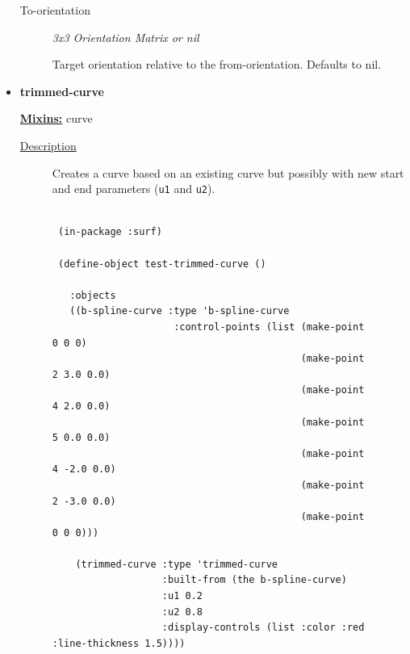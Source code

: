 \documentclass [11pt]{book}
\begin{document}
\begin{itemize}
\begin{description}
\item [To-orientation]
\emph{3x3 Orientation Matrix or nil}

 Target orientation relative to the from-orientation. Defaults to nil.




\end{description}







\item {}
\label{prim:trimmed-curve}
\textbf{trimmed-curve}


\textbf{
\underline{Mixins:}} curve





\begin{description}

\item [
\underline{Description}]


Creates a curve based on an existing curve but possibly with new start and end parameters (\texttt{u1} and \texttt{u2}).



\end{description}




\begin{figure}
\begin{lrbox}{\boxedverb}
\begin{minipage}{\linewidth}
{\small

\begin{verbatim}
  
 (in-package :surf)

 (define-object test-trimmed-curve ()

   :objects
   ((b-spline-curve :type 'b-spline-curve
                     :control-points (list (make-point 0 0 0)
                                           (make-point 2 3.0 0.0) 
                                           (make-point 4 2.0 0.0) 
                                           (make-point 5 0.0 0.0) 
                                           (make-point 4 -2.0 0.0) 
                                           (make-point 2 -3.0 0.0) 
                                           (make-point 0 0 0)))
    
    (trimmed-curve :type 'trimmed-curve
                   :built-from (the b-spline-curve)
                   :u1 0.2
                   :u2 0.8
                   :display-controls (list :color :red :line-thickness 1.5))))


\end{verbatim}}
\end{minipage}
\end{lrbox}
\end{figure}
\end{itemize}
\end{document}
